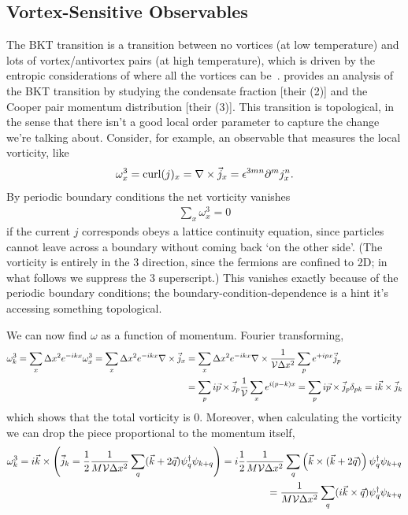 \subsection{Vortex-Sensitive Observables}\label{sec:vortex}

The BKT transition is a transition between no vortices (at low temperature) and lots of vortex/antivortex pairs (at high temperature), which is driven by the entropic considerations of where all the vortices can be~\cite{1971JETP...32..493B,1972JETP...34..610B,Kosterlitz:1973}.
 provides an analysis of the BKT transition by studying the condensate fraction [their (2)] and the Cooper pair momentum distribution [their (3)].
This transition is topological, in the sense that there isn't a good local order parameter to capture the change we're talking about.
Consider, for example, an observable that measures the local vorticity, like
\begin{align}
	\omega^3_x = \text{curl}(j)_x = \nabla \times \vec{j}_x = \epsilon^{3mn} \partial^m j^n_x.
\end{align}
By periodic boundary conditions the net vorticity vanishes
\begin{align}
	\sum_x \omega^3_x = 0
	\label{eq:net vorticity}
\end{align}
if the current $j$ corresponds obeys a lattice continuity equation, since particles cannot leave across a boundary without coming back `on the other side'.
(The vorticity is entirely in the 3 direction, since the fermions are confined to 2D; in what follows we suppress the 3 superscript.)
This vanishes exactly because of the periodic boundary conditions; the boundary-condition-dependence is a hint it's accessing something topological.

We can now find $\omega$ as a function of momentum.
Fourier transforming,
\begin{align}
	\omega^3_k
	= \sum_x \Delta x^2 e^{-ikx} \omega^3_x
	= \sum_x \Delta x^2 e^{-ikx} \nabla \times \vec{j}_x
	&= \sum_x \Delta x^2 e^{-ikx} \nabla \times \frac{1}{\mathcal{V} \Delta x^2} \sum_p e^{+ipx} \vec{j}_p
\nonumber\\
	&= \sum_p i\vec{p} \times \vec{j}_p \frac{1}{\mathcal{V}} \sum_x e^{i(p-k)x}
	= \sum_p i\vec{p} \times \vec{j}_p \delta_{pk}
	= i \vec{k} \times \vec{j}_k
\end{align}
which shows that the total vorticity is 0.
Moreover, when calculating the vorticity we can drop the piece proportional to the momentum itself,
\begin{align}
	\omega^3_k
	= i \vec{k} \times \left(\vec{j}_k = \frac{1}{2}\frac{1}{M \mathcal{V}\Delta x^2} \sum_q (\vec{k}+2\vec{q}) \psi{}^{\dagger}_{q} \psi_{k+q}\right)
	= i \frac{1}{2}\frac{1}{M \mathcal{V}\Delta x^2} \sum_q \left(\vec{k} \times (\vec{k}+2\vec{q})\right) \psi{}^{\dagger}_{q} \psi_{k+q}
\nonumber\\
	= \frac{1}{M \mathcal{V}\Delta x^2} \sum_q (i\vec{k} \times \vec{q}) \psi{}^{\dagger}_{q} \psi_{k+q}
\end{align}

